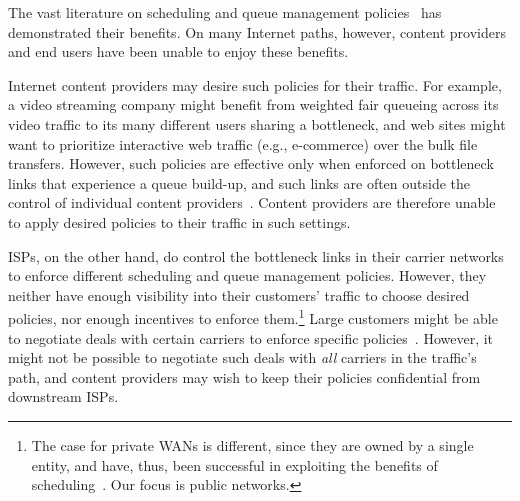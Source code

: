 
The vast literature on scheduling and queue management policies~\cite{diffserv, fair-queueing, sfq, pie, CoDel, fifoplus, virtualClocks, csfq, drr, red, ecn} has demonstrated their benefits.
On many Internet paths, however, content providers and end users have been unable to enjoy these benefits.

Internet content providers may desire such policies for their traffic. For example, a video streaming company might benefit from weighted fair queueing across its video traffic to its many different users sharing a bottleneck, and web sites might want to prioritize  interactive web traffic (e.g., e-commerce) over the bulk file transfers. 
However, such policies are effective only when enforced on bottleneck links that experience a queue build-up, and such links are often outside the control of individual content 
providers~\cite{inferring-interdomain-congestion, isp-throttle-1, isp-throttle-2, isp-throttle-3}. 
Content providers are therefore unable to apply desired policies to their traffic in such settings. 

ISPs, on the other hand, do control the bottleneck links in their carrier networks to enforce different scheduling and queue management policies. 
However, they neither have enough visibility into their customers' traffic to choose desired policies, nor enough incentives to enforce them.\footnote{The case for private WANs is different, since they are owned by a single entity, and have, thus, been successful in exploiting the benefits of scheduling~\cite{swan, b4, bwe}. Our focus is public networks.} 
Large customers might be able to negotiate deals with certain carriers to enforce specific policies~\cite{att-qos}. However, it might not be possible to negotiate such deals with \emph{all} carriers in the traffic's path, and content providers may wish to keep their policies confidential from downstream ISPs.

